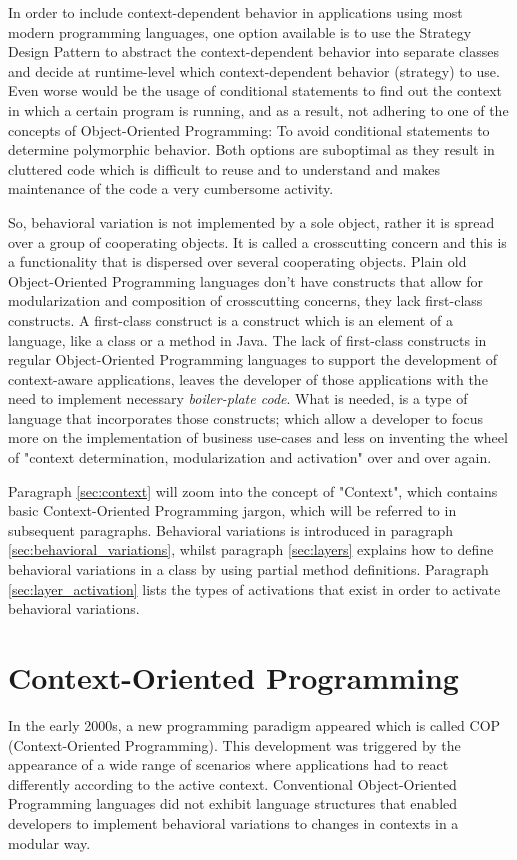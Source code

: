 \documentclass{acm_proc_article-sp}
\begin{document}
In order to include context-dependent behavior in applications using most modern programming languages, one option available is to use the Strategy Design Pattern \cite{strategypattern} to abstract the context-dependent behavior into separate classes and decide at runtime-level which context-dependent behavior (strategy) to use. Even worse would be the usage of conditional statements to find out the context in which a certain program is running, and as a result, not adhering to one of the concepts of Object-Oriented Programming: To avoid conditional statements to determine polymorphic behavior. Both options are suboptimal as they result in cluttered code which is difficult to reuse and to understand and makes maintenance of the code a very cumbersome activity.

So, behavioral variation is not implemented by a sole object, rather it is spread over a group of cooperating objects. It is called a crosscutting concern \cite{kiczalesetallaop} and this is a functionality that is dispersed over several cooperating objects. Plain old Object-Oriented Programming languages don't have constructs that allow for modularization and composition of crosscutting concerns, they lack first-class constructs. A first-class construct \cite{Keays:2003:CP:940923.940926} is a construct which is an element of a language, like a class or a method in Java. The lack of first-class constructs in regular Object-Oriented Programming languages to support the development of context-aware applications, leaves the developer of those applications with the need to implement necessary \textit{boiler-plate code}. What is needed, is a type of language that incorporates those constructs; which allow a developer to focus more on the implementation of business use-cases and less on inventing the wheel of "context determination, modularization and activation" over and over again. 

Paragraph \ref{sec:context} will zoom into the concept of "Context", which contains basic Context-Oriented Programming jargon, which will be referred to in subsequent paragraphs. Behavioral variations is introduced in paragraph \ref{sec:behavioral_variations}, whilst paragraph \ref{sec:layers} explains how to define behavioral variations in a class by using partial method definitions. Paragraph \ref{sec:layer_activation} lists the types of activations that exist in order to activate behavioral variations. 

\section{Context-Oriented Programming}
\label{cop}
In the early 2000s, a new programming paradigm appeared which is called COP (Context-Oriented Programming). This development was triggered by the appearance of a wide range of scenarios where applications had to react differently according to the active context. Conventional Object-Oriented Programming languages did not exhibit language structures that enabled developers to implement behavioral variations to changes in contexts in a modular way. 
\end{document}
